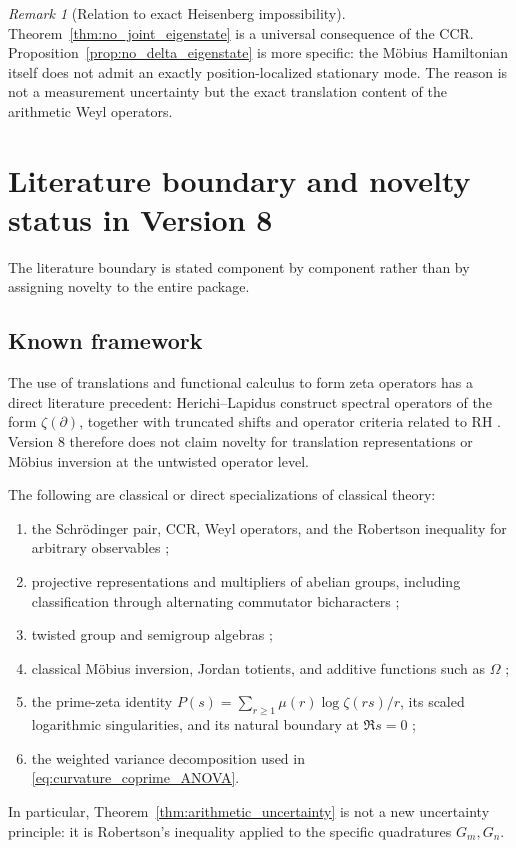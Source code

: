\documentclass[11pt]{amsart}
\numberwithin{equation}{section}
\theoremstyle{plain}
\theoremstyle{definition}
\theoremstyle{remark}
\newtheorem{remark}[theorem]{Remark}
\begin{document}
\begin{remark}[Relation to exact Heisenberg impossibility]
\label{rem:nonlocalization_relation}
Theorem~\ref{thm:no_joint_eigenstate} is a universal consequence of the CCR.
Proposition~\ref{prop:no_delta_eigenstate} is more specific: the M\"obius
Hamiltonian itself does not admit an exactly position-localized stationary
mode.  The reason is not a measurement uncertainty but the exact translation
content of the arithmetic Weyl operators.
\end{remark}

\section{Literature boundary and novelty status in Version 8}
\label{sec:status_classification}

The literature boundary is stated component by component rather than by
assigning novelty to the entire package.

\subsection{Known framework}
\label{subsec:known_framework}

The use of translations and functional calculus to form zeta operators has a
direct literature precedent: Herichi--Lapidus construct spectral operators of
the form \(\zeta(\partial)\), together with truncated shifts and operator
criteria related to RH \cite{HerichiLapidus2014}.  Version 8 therefore does
not claim novelty for translation representations or M\"obius inversion at
the untwisted operator level.

The following are classical or direct specializations of classical theory:
\begin{enumerate}[leftmargin=*]
\item the Schr\"odinger pair, CCR, Weyl operators, and the Robertson
inequality for arbitrary observables \cite{Robertson1929,Folland1989};
\item projective representations and multipliers of abelian groups, including
classification through alternating commutator bicharacters
\cite{Kleppner1965,BaggettKleppner1973};
\item twisted group and semigroup algebras
\cite{PackerRaeburn1992,RigalZadunaisky2015};
\item classical M\"obius inversion, Jordan totients, and additive functions
such as \(\Omega\) \cite{Apostol1976};
\item the prime-zeta identity
\(P(s)=\sum_{r\ge1}\mu(r)\log\zeta(rs)/r\), its scaled logarithmic
singularities, and its natural boundary at \(\Re s=0\)
\cite{Froberg1968};
\item the weighted variance decomposition used in
\eqref{eq:curvature_coprime_ANOVA}.
\end{enumerate}
In particular, Theorem~\ref{thm:arithmetic_uncertainty} is not a new
uncertainty principle: it is Robertson's inequality applied to the specific
quadratures \(G_m,G_n\).
\end{document}
